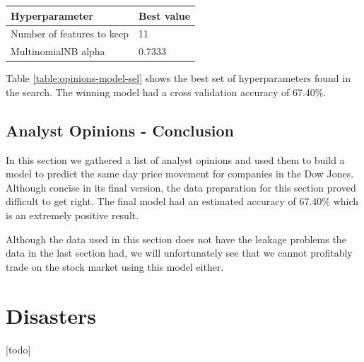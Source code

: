 \documentclass{report}
\begin{document}
\begin{center}
  \begin{tabular}{l | l}
	  \textbf{Hyperparameter} & \textbf{Best value} \\ \hline
	  Number of features to keep & 11 \\ \hline
	  MultinomialNB alpha & 0.7333
	  \label{table:opinions-model-sel}
  \end{tabular}
\end{center}

Table \ref{table:opinions-model-sel} shows the best set of hyperparameters found in the search. The winning model had a cross validation accuracy of 67.40\%.

\subsection{Analyst Opinions - Conclusion}

In this section we gathered a list of analyst opinions and used them to build a model to predict the same day price movement for companies in the Dow Jones. Although concise in its final version, the data preparation for this section proved difficult to get right. The final model had an estimated accuracy of 67.40\% which is an extremely positive result. 

Although the data used in this section does not have the leakage problems the data in the last section had, we will unfortunately see that we cannot profitably trade on the stock market using this model either. 

\clearpage
\section{Disasters}

[todo]



\end{document}
